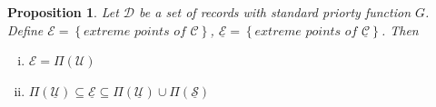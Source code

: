 \documentclass{article}
\newtheorem{prop}{Proposition}
\theoremstyle{case}
\begin{document}
\begin{prop} \label{prop0}
Let $\mathcal{D}$ be a set of records with standard priorty function $G$. Define $\mathcal{E} = \left\lbrace \textit{extreme points of } \mathcal{C}\right\rbrace$, $\underline{\mathcal{E}} = \left\lbrace \textit{extreme points of } \underline{\mathcal{C}}\right\rbrace$. Then
\begin{enumerate}[(i)]
	\item $\mathcal{E} = \Pi\left( \mathcal{U}\right)$
	\item $\Pi\left( \mathcal{\underline{U}}\right) \subseteq \underline{\mathcal{E}} \subseteq \Pi\left( \mathcal{\underline{U}}\right) \cup \Pi\left( \mathcal{\underline{S}}\right)$
\end{enumerate}
\end{prop}
\end{document}
